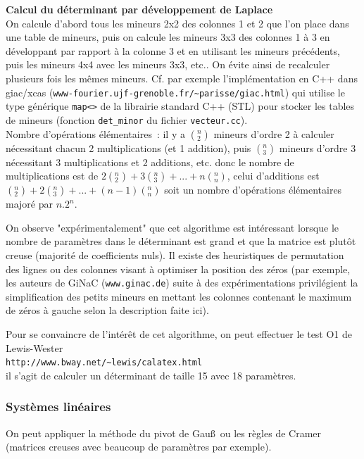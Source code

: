 \documentclass[a4paper,11pt]{article}
\begin{document}
\begin{giacjshere}
{\bf Calcul du déterminant par développement de Laplace}\\
On calcule d'abord tous les mineurs 2x2 des colonnes 1 et 2
que l'on place dans une table de mineurs,
puis on calcule les mineurs 3x3 des colonnes 1 \`a 3 en développant
par rapport à la colonne 3 et en utilisant les mineurs pr\'ec\'edents,
puis les mineurs 4x4 avec les mineurs 3x3, etc.. 
On évite ainsi de recalculer plusieurs fois les mêmes mineurs.
Cf. par exemple l'implémentation en C++ dans giac/xcas
(\verb|www-fourier.ujf-grenoble.fr/~parisse/giac.html|)
qui utilise le type générique \verb|map<>| de la librairie standard C++ (STL)
pour stocker les tables de mineurs (fonction 
\verb|det_minor| du fichier {\tt vecteur.cc}).\\
Nombre d'opérations élémentaires~: il y a $(^n_2)$ mineurs d'ordre 2
à calculer nécessitant chacun 2 multiplications (et 1 addition),
puis $(^n_3)$ mineurs d'ordre 3 nécessitant 3 multiplications et
2 additions, etc. donc le nombre de multiplications est de
$2(^n_2)+3(^n_3)+...+n(^n_n)$, celui d'additions est
$(^n_2)+2(^n_3)+...+(n-1)(^n_n)$ soit un nombre d'opérations
élémentaires majoré par $n.2^n$.

On observe "expérimentalement" que cet algorithme est intéressant
lorsque le nombre de
paramètres dans le déterminant est grand et que la matrice est
plutôt creuse (majorité de coefficients nuls). Il existe des
heuristiques de permutation des lignes ou des colonnes visant
à optimiser la position des zéros (par exemple, les auteurs de GiNaC
(\verb|www.ginac.de|) suite à des expérimentations
privilégient la simplification des petits mineurs en mettant les colonnes 
contenant le maximum de z\'eros \`a gauche selon la description faite
ici). 

Pour se convaincre de l'int\'er\^et de cet algorithme, on peut effectuer
le test O1 de Lewis-Wester\\
\verb|http://www.bway.net/~lewis/calatex.html|\\
il s'agit de calculer un d\'eterminant de taille 15 avec 18 param\`etres.

\subsubsection{Syst\`emes lin\'eaires}
On peut appliquer la m\'ethode du pivot de Gau\ss\ ou les r\`egles
de Cramer (matrices creuses avec beaucoup de param\`etres par exemple). 


\end{giacjshere}
\end{document}
